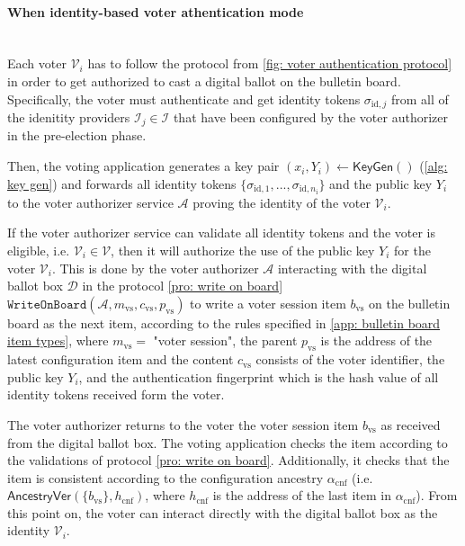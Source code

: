 \paragraph{When identity-based voter athentication mode}\mbox{}\\
Each voter $\mathcal{V}_i$ has to follow the protocol from \cref{fig: voter authentication protocol} in order to get authorized to cast a digital ballot on the bulletin board. Specifically, the voter must authenticate and get identity tokens $\sigma_{\mathrm{id}, j}$ from all of the idenitity providers $\mathcal{I}_j \in \boldsymbol{\mathcal{I}}$ that have been configured by the voter authorizer in the pre-election phase.

Then, the voting application generates a key pair $(x_i, Y_i) \gets \mathsf{KeyGen}()$ (\cref{alg: key gen}) and forwards all identity tokens $\{ \sigma_{\mathrm{id}, 1}, ..., \sigma_{\mathrm{id}, n_\mathrm{i}} \}$ and the public key $Y_i$ to the voter authorizer service $\mathcal{A}$ proving the identity of the voter $\mathcal{V}_i$.

If the voter authorizer service can validate all identity tokens and the voter is eligible, i.e. $\mathcal{V}_i \in \boldsymbol{\mathcal{V}}$, then it will authorize the use of the public key $Y_i$ for the voter $\mathcal{V}_i$. This is done by the voter authorizer $\mathcal{A}$ interacting with the digital ballot box $\mathcal{D}$ in the protocol \ref{pro: write on board} $\mathtt{WriteOnBoard}(\mathcal{A}, m_\mathrm{vs}, c_\mathrm{vs}, p_\mathrm{vs})$ to write a voter session item $b_\mathrm{vs}$ on the bulletin board as the next item, according to the rules specified in \cref{app: bulletin board item types}, where $m_\mathrm{vs} =$ "voter session", the parent $p_\mathrm{vs}$ is the address of the latest configuration item and the content $c_\mathrm{vs}$ consists of the voter identifier, the public key $Y_i$, and the authentication fingerprint which is the hash value of all identity tokens received form the voter. 

The voter authorizer returns to the voter the voter session item $b_\mathrm{vs}$ as received from the digital ballot box. The voting application checks the item according to the validations of protocol \ref{pro: write on board}. Additionally, it checks that the item is consistent according to the configuration ancestry $\alpha_\mathrm{cnf}$ (i.e. $\mathsf{AncestryVer}(\{ b_\mathrm{vs} \}, h_\mathrm{cnf})$, where $h_\mathrm{cnf}$ is the address of the last item in $\alpha_\mathrm{cnf}$). From this point on, the voter can interact directly with the digital ballot box as the identity $\mathcal{V}_i$.

